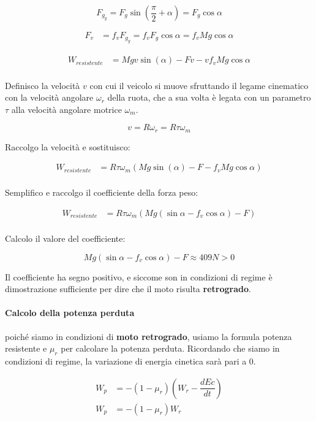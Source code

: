 \documentclass[main.tex]{subfiles}
\begin{document}
\[
	F_{g_y} = F_g\sin(\dfrac{\pi}{2}+\alpha) = F_g\cos\alpha
\]

\begin{align*}
	F_v &= f_vF_{g_y} = f_vF_g\cos\alpha = f_vMg\cos\alpha
\end{align*}

\begin{align*}
	W_{resistente} &= Mgv\sin(\alpha) - Fv - vf_vMg\cos\alpha \\
\end{align*}

Definisco la velocità $v$ con cui il veicolo si muove sfruttando il legame cinematico con la velocità angolare $\omega_r$ della ruota, che a sua volta è legata con un parametro $\tau$ alla velocità angolare motrice $\omega_m$.

\[v = R\omega_r = R\tau\omega_m\]

Raccolgo la velocità e sostituisco:

\begin{align*}
	W_{resistente} &= R\tau\omega_m(Mg\sin(\alpha) - F - f_vMg\cos\alpha) \\
\end{align*}

Semplifico e raccolgo il coefficiente della forza peso:

\begin{align*}
	W_{resistente} &= R\tau\omega_m(Mg(\sin\alpha - f_v\cos\alpha) - F) \\
\end{align*}



Calcolo il valore del coefficiente:

\[
	Mg(\sin\alpha - f_v\cos\alpha) - F \approx 409 N > 0
\]

Il coefficiente ha segno positivo, e siccome son in condizioni di regime è dimostrazione sufficiente per dire che il moto risulta \textbf{retrogrado}.

\paragraph{Calcolo della potenza perduta}
poiché siamo in condizioni di \textbf{moto retrogrado}, usiamo la formula potenza resistente e $\mu_r$ per calcolare la potenza perduta. Ricordando che siamo in condizioni di regime, la variazione di energia cinetica sarà pari a 0.

\begin{align*}
	W_p &= -(1-\mu_r)(W_r - \dfrac{dEc}{dt}) \\
	W_p &= -(1-\mu_r)W_r \\
\end{align*}
\end{document}
